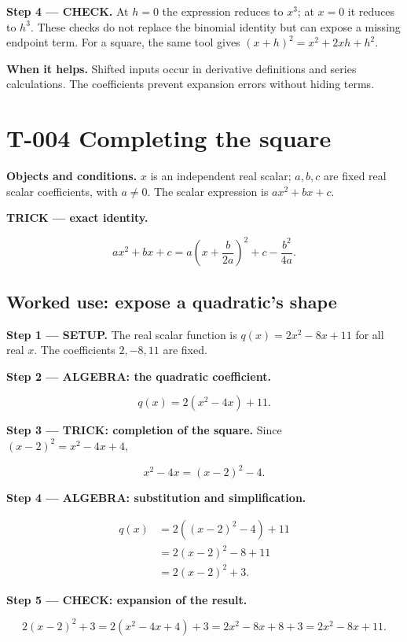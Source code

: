 \documentclass[11pt,oneside,openany]{book}
\begin{document}
\endgroup
\textbf{Step 4 --- CHECK.} At \(h=0\) the expression reduces to \(x^3\); at \(x=0\) it
reduces to \(h^3\). These checks do not replace the binomial identity but can expose
a missing endpoint term. For a square, the same tool gives
\((x+h)^2=x^2+2xh+h^2\).

\textbf{When it helps.} Shifted inputs occur in derivative definitions and series
calculations. The coefficients prevent expansion errors without hiding terms.

\section{T-004 Completing the square}

\textbf{Objects and conditions.} \(x\) is an independent real scalar; \(a,b,c\) are fixed
real scalar coefficients, with \(a\ne0\). The scalar expression is \(ax^2+bx+c\).

\textbf{TRICK --- exact identity.}

\[
ax^2+bx+c=a\left(x+\frac{b}{2a}\right)^2+c-\frac{b^2}{4a}.
\]

\subsection{Worked use: expose a quadratic's shape}

\textbf{Step 1 --- SETUP.} The real scalar function is \(q(x)=2x^2-8x+11\) for all
real \(x\). The coefficients \(2,-8,11\) are fixed.

\begingroup\color{TrickPurple}
\textbf{Step 2 --- ALGEBRA: the quadratic coefficient.}

\[
q(x)=2(x^2-4x)+11.
\]

\endgroup
\begingroup\color{TrickPurple}
\textbf{Step 3 --- TRICK: completion of the square.} Since
\((x-2)^2=x^2-4x+4\),

\[
x^2-4x=(x-2)^2-4.
\]

\endgroup
\begingroup\color{TrickPurple}
\textbf{Step 4 --- ALGEBRA: substitution and simplification.}

\[
\begin{aligned}
q(x)&=2\left((x-2)^2-4\right)+11\\
&=2(x-2)^2-8+11\\
&=2(x-2)^2+3.
\end{aligned}
\]

\endgroup
\textbf{Step 5 --- CHECK: expansion of the result.}

\[
2(x-2)^2+3=2(x^2-4x+4)+3
=2x^2-8x+8+3=2x^2-8x+11.
\]
\end{document}
